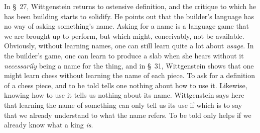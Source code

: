 \documentclass[doc,12pt,apacite,biblatex]{apa6}
\begin{document}
In \S~27, Wittgenstein returns to ostensive definition, and the critique to
which he has been building starts to solidify. He points out that the builder's
language has no way of asking something's name. Asking for a name is a language
game 
that we are brought up to perform, but which might, conceivably, not be
available. 
Obviously, without learning names, one can still learn quite a lot about
\emph{usage}. In the builder's game, one can learn to produce a slab when she
hears  without it \emph{necessarily} being a name for the thing, 
and in \S~31, Wittgenstein shows that one might learn chess without learning
the name of each piece. To ask for a definition of a chess piece, 
and to be told  tells one nothing about how to use it.
Likewise, knowing how to use it
tells us nothing about its name. Wittgenstein says here that learning the name
of something can only tell us its use if  which is to say that we already understand to what the name refers.
To be told  only helps if we already know what a king
\emph{is}.
\end{document}
